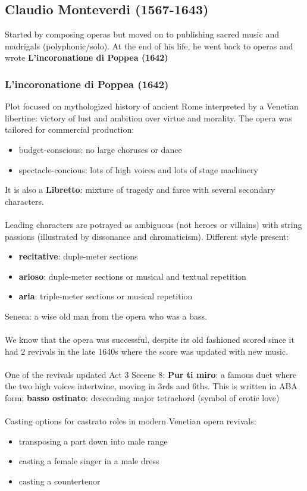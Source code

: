 \documentclass{article}
\begin{document}
  \subsection{Claudio Monteverdi (1567-1643)}
  Started by composing operas but moved on to publishing sacred music and madrigals (polyphonic/solo). At the end of his life, he went back to operas and wrote \textbf{L'incoronatione di Poppea (1642)}
  \subsubsection{L'incoronatione di Poppea (1642)}
  Plot focused on mythologized history of ancient Rome interpreted by a Venetian libertine: victory of lust and ambition over virtue and morality. The opera was tailored for commercial production:
  \begin{itemize}
    \item budget-conscious: no large choruses or dance
    \item spectacle-concious: lots of high voices and lots of stage machinery
  \end{itemize}
  It is also a \textbf{Libretto}: mixture of tragedy and farce with several secondary characters. \\ \\
  Leading characters are potrayed as ambiguous (not heroes or villains) with string passions (illustrated by dissonance and chromaticism). Different style present:
  \begin{itemize}
    \item \textbf{recitative}: duple-meter sections
    \item \textbf{arioso}: duple-meter sections or musical and textual repetition
    \item \textbf{aria}: triple-meter sections or musical repetition
  \end{itemize}
  Seneca: a wise old man from the opera who was a bass. \\ \\
  We know that the opera was successful, despite its old fashioned scored since it had 2 revivals in the late 1640s where the score was updated with new music. \\ \\
  One of the revivals updated Act 3 Sceene 8: \textbf{Pur ti miro}: a famous duet where the two high voices intertwine, moving in 3rds and 6ths. This is written in ABA form; \textbf{basso ostinato}: descending major tetrachord (symbol of erotic love) \\ \\
  Casting options for castrato roles in modern Venetian opera revivals:
  \begin{itemize}
    \item transposing a part down into male range
    \item casting a female singer in a male dress
    \item casting a countertenor
  \end{itemize}
\end{document}
